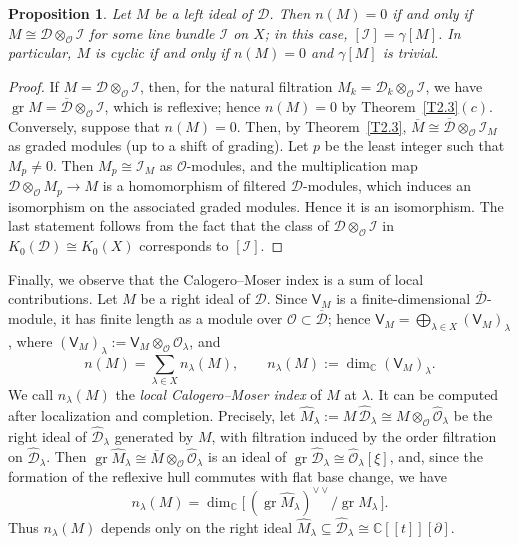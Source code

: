 \documentclass[11pt,reqno]{amsart}
\theoremstyle{plain}
\newtheorem{proposition}{Proposition}[section]
\theoremstyle{definition}
\theoremstyle{remark}
\numberwithin{equation}{section}
\newcommand{\cD}{\mathcal{D}}
\newcommand{\cO}{\mathcal{O}}
\newcommand{\C}{\mathbb{C}}
\newcommand{\del}{\partial}
\newcommand{\hO}{\widehat{\cO}}
\newcommand{\hD}{\widehat{\cD}}
\newcommand{\bD}{\overline{\cD}}
\newcommand{\bM}{\overline{M}}
\DeclareMathOperator{\gr}{gr}
\begin{document}
\begin{proposition}
\label{P2.3}
Let $M$ be a left ideal of $\cD$. Then $n(M) = 0$ if and only if $M \cong \cD \otimes_{\cO}
\mathcal{I}$ for some line bundle $\mathcal{I}$ on $X$; in this case, $[\mathcal{I}] =
\gamma[M]$. In particular, $M$ is cyclic if and only if $n(M) = 0$ and $\gamma[M]$ is trivial.
\end{proposition}

\begin{proof}
If $M = \cD \otimes_{\cO} \mathcal{I}$, then, for the natural filtration $M_k = \cD_k
\otimes_{\cO} \mathcal{I}$, we have $\gr M = \bD \otimes_{\cO} \mathcal{I}$, which is reflexive;
hence $n(M) = 0$ by Theorem~\ref{T2.3}$(c)$. Conversely, suppose that $n(M) = 0$. Then, by
Theorem~\ref{T2.3}, $\bM \cong \bD \otimes_{\cO} \mathcal{I}_M$ as graded modules (up to a shift
of grading). Let $p$ be the least integer such that $M_p \ne 0$. Then $M_p \cong \mathcal{I}_M$
as $\cO$-modules, and the multiplication map $\cD \otimes_{\cO} M_p \to M$ is a homomorphism of
filtered $\cD$-modules, which induces an isomorphism on the associated graded modules. Hence it
is an isomorphism. The last statement follows from the fact that the class of
$\cD \otimes_{\cO} \mathcal{I}$ in $K_0(\cD) \cong K_0(X)$ corresponds to $[\mathcal{I}]$.
\end{proof}

Finally, we observe that the Calogero--Moser index is a sum of local contributions. Let $M$ be a
right ideal of $\cD$. Since $\mathsf{V}_M$ is a finite-dimensional $\bD$-module, it has finite
length as a module over $\cO \subset \bD$; hence $\mathsf{V}_M = \bigoplus_{\lambda \in X}
(\mathsf{V}_M)_\lambda$, where $(\mathsf{V}_M)_\lambda := \mathsf{V}_M \otimes_{\cO} \cO_\lambda$,
and
\begin{equation}
\label{E211}
  n(M) = \sum_{\lambda \in X} n_\lambda(M) , \qquad n_\lambda(M) := \dim_{\C}
  (\mathsf{V}_M)_\lambda .
\end{equation}
We call $n_\lambda(M)$ the \emph{local Calogero--Moser index} of $M$ at $\lambda$. It can be
computed after localization and completion. Precisely, let $\widehat{M}_\lambda := M\, \hD_\lambda
\cong M \otimes_{\cO} \hO_\lambda$ be the right ideal of $\hD_\lambda$ generated by $M$, with
filtration induced by the order filtration on $\hD_\lambda$. Then $\gr \widehat{M}_\lambda \cong
\bM \otimes_{\cO} \hO_\lambda$ is an ideal of $\gr \hD_\lambda \cong \hO_\lambda[\xi]$, and, since
the formation of the reflexive hull commutes with flat base change, we have
\begin{equation}
\label{E212}
  n_\lambda(M) = \dim_{\C}\bigl[\, (\gr \widehat{M}_\lambda)^{\vee\vee} \big/ \gr
  \widehat{M}_\lambda \,\bigr] .
\end{equation}
Thus $n_\lambda(M)$ depends only on the right ideal $\widehat{M}_\lambda \subseteq \hD_\lambda
\cong \C[[t]][\del]$.
\end{document}
